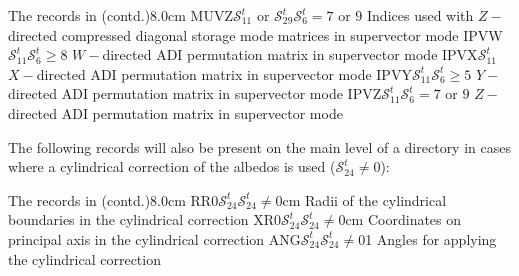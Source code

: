 \begin{DescriptionEnregistrement}{The  records in
 (contd.)}{8.0cm}
\OptIntEnr
  {MUVZ}{$\mathcal{S}^{t}_{11}$ or $\mathcal{S}^{t}_{29}$}{$\mathcal{S}^{t}_{6}=7$ or $9$}
  {Indices used with $Z-$directed compressed diagonal storage mode matrices in supervector mode}
\OptIntEnr
  {IPVW}{$\mathcal{S}^{t}_{11}$}{$\mathcal{S}^{t}_{6}\ge 8$}
  {$W-$directed ADI permutation matrix in supervector mode}
\IntEnr
  {IPVX}{$\mathcal{S}^{t}_{11}$}
  {$X-$directed ADI permutation matrix in supervector mode}
\OptIntEnr
  {IPVY}{$\mathcal{S}^{t}_{11}$}{$\mathcal{S}^{t}_{6}\ge 5$}
  {$Y-$directed ADI permutation matrix in supervector mode}
\OptIntEnr
  {IPVZ}{$\mathcal{S}^{t}_{11}$}{$\mathcal{S}^{t}_{6}=7$ or $9$}
  {$Z-$directed ADI permutation matrix in supervector mode}
\end{DescriptionEnregistrement}

The following records will also be present on the main level of a 
directory in cases where a cylindrical correction of the albedos is used ($\mathcal{S}^{t}_{24}\ne 0$):

\begin{DescriptionEnregistrement}{The  records in
 (contd.)}{8.0cm}
\OptRealEnr
  {RR0}{$\mathcal{S}^{t}_{24}$}{$\mathcal{S}^{t}_{24}\ne 0$}{cm}
  {Radii of the cylindrical boundaries in the cylindrical correction}
\OptRealEnr
  {XR0}{$\mathcal{S}^{t}_{24}$}{$\mathcal{S}^{t}_{24}\ne 0$}{cm}
  {Coordinates on principal axis in the cylindrical correction}
\OptRealEnr
  {ANG}{$\mathcal{S}^{t}_{24}$}{$\mathcal{S}^{t}_{24}\ne 0$}{1}
  {Angles for applying the cylindrical correction}
\end{DescriptionEnregistrement}

\eject
